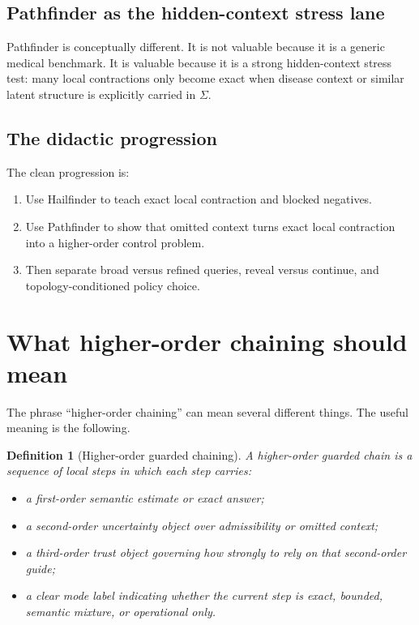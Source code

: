 \documentclass[11pt]{article}
\newtheorem{definition}{Definition}
\newcommand{\sigmactx}{\Sigma}
\begin{document}
\subsection{Pathfinder as the hidden-context stress lane}
Pathfinder is conceptually different. It is not valuable because it is a generic medical benchmark. It is valuable because it is a strong hidden-context stress test: many local contractions only become exact when disease context or similar latent structure is explicitly carried in $\sigmactx$.

\subsection{The didactic progression}
The clean progression is:
\begin{enumerate}[label=\arabic*.]
    \item Use Hailfinder to teach exact local contraction and blocked negatives.
    \item Use Pathfinder to show that omitted context turns exact local contraction into a higher-order control problem.
    \item Then separate broad versus refined queries, reveal versus continue, and topology-conditioned policy choice.
\end{enumerate}

\section{What higher-order chaining should mean}
The phrase ``higher-order chaining'' can mean several different things. The useful meaning is the following.

\begin{definition}[Higher-order guarded chaining]
A higher-order guarded chain is a sequence of local steps in which each step carries:
\begin{itemize}
    \item a first-order semantic estimate or exact answer;
    \item a second-order uncertainty object over admissibility or omitted context;
    \item a third-order trust object governing how strongly to rely on that second-order guide;
    \item a clear mode label indicating whether the current step is exact, bounded, semantic mixture, or operational only.
\end{itemize}
\end{definition}
\end{document}
